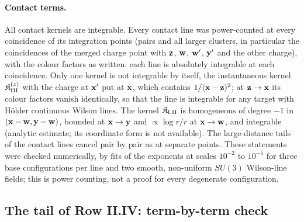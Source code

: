 \paragraph{Contact terms.} All contact kernels are integrable. Every contact line was power-counted at every coincidence of its integration points (pairs and all larger clusters, in particular the coincidences of the merged charge point with $\mathbf{z}$, $\mathbf{w}$, $\mathbf{w}'$, $\mathbf{y}'$ and the other charge), with the colour factors as written: each line is absolutely integrable at each coincidence. Only one kernel is not integrable by itself, the instantaneous kernel $\mathfrak K^{(z)}_{\rm III}$ with the charge at $\mathbf{x}'$ put at $\mathbf{x}$, which contains $1/(\mathbf{x}-\mathbf{z})^2$; at $\mathbf{z}\to\mathbf{x}$ its colour factors vanish identically, so that the line is integrable for any target with H\"older continuous Wilson lines. The kernel $\mathfrak K_{\rm I.II}$ is homogeneous of degree $-1$ in $(\mathbf{x}-\mathbf{w},\mathbf{y}-\mathbf{w})$, bounded at $\mathbf{x}\to\mathbf{y}$ and $\propto\log r/r$ at $\mathbf{x}\to\mathbf{w}$, and integrable (analytic estimate; its coordinate form is not available). The large-distance tails of the contact lines cancel pair by pair as at separate points. These statements were checked numerically, by fits of the exponents at scales $10^{-2}$ to $10^{-5}$ for three base configurations per line and two smooth, non-uniform $SU(3)$ Wilson-line fields; this is power counting, not a proof for every degenerate configuration.

\subsection{The tail of Row II.IV: term-by-term check}\label{app:tail_check}

